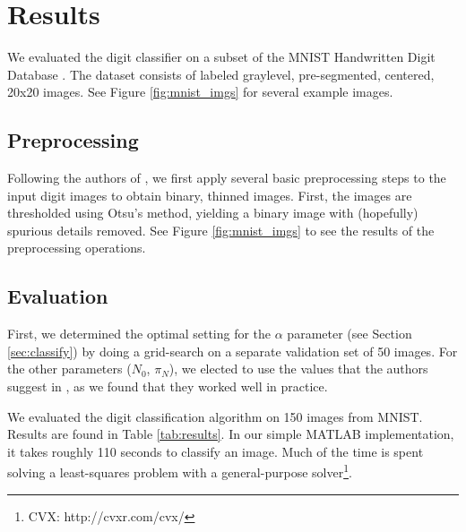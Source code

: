\documentclass[oribibl]{llncs}
\begin{document}
\section{Results}

We evaluated the digit classifier on a subset of the MNIST Handwritten Digit Database \cite{mnist}.
The dataset consists of labeled graylevel, pre-segmented, centered, 20x20 images.
See Figure \ref{fig:mnist_imgs} for several example images.

\subsection{Preprocessing}
\label{sec:preproc}

Following the authors of \cite{Hinton92adaptiveelastic}, we first apply several basic preprocessing steps to the input digit images to obtain binary, thinned images.
First, the images are thresholded using Otsu's method, yielding a binary image with (hopefully) spurious details removed.
See Figure \ref{fig:mnist_imgs} to see the results of the preprocessing operations.

\subsection{Evaluation}

First, we determined the optimal setting for the $\alpha$ parameter (see Section \ref{sec:classify}) by doing a grid-search on a separate validation set of 50 images.
For the other parameters ($N_0$, $\pi_N$), we elected to use the values that the authors suggest in \cite{Hinton92adaptiveelastic}, as we found that they worked well in practice.

We evaluated the digit classification algorithm on 150 images from MNIST.
Results are found in Table \ref{tab:results}.
In our simple MATLAB implementation, it takes roughly 110 seconds to classify an image.
Much of the time is spent solving a least-squares problem with a general-purpose solver\footnote{CVX: http://cvxr.com/cvx/}.
\end{document}
